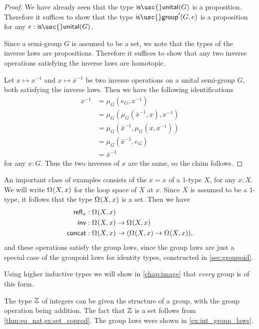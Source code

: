 \begin{proof}
  We have already seen that the type $\mathsf{is\usc{}unital}(G)$ is a proposition. Therefore it suffices to show that the type $\mathsf{is\usc{}group}'(G,e)$ is a proposition for any $e:\mathsf{is\usc{}unital}(G)$.

  Since a semi-group $G$ is assumed to be a set, we note that the types of the inverse laws are propositions. Therefore it suffices to show that any two inverse operations satisfying the inverse laws are homotopic.

  Let $x\mapsto x^{-1}$ and $x\mapsto \bar{x}^{-1}$ be two inverse operations on a unital semi-group $G$, both satisfying the inverse laws. Then we have the following identifications
  \begin{align*}
    x^{-1} & = \mu_G(e_G,x^{-1}) \\
    & = \mu_G(\mu_G(\bar{x}^{-1},x),x^{-1}) \\
    & = \mu_G(\bar{x}^{-1},\mu_G(x,x^{-1})) \\
    & = \mu_G(\bar{x}^{-1},e_G) \\
    & = \bar{x}^{-1}
  \end{align*}
  for any $x:G$. Thus the two inverses of $x$ are the same, so the claim follows.
\end{proof}

\begin{eg}
  An important class of examples consists of the  $x=x$ of a $1$-type $X$, for any $x:X$. 
  We will write $\Omega^{}(X,x)$ for the loop space of $X$ at $x$. 
  Since $X$ is assumed to be a $1$-type, it follows that the type $\Omega^{}(X,x)$ is a set. Then we have
  \begin{align*}
    \mathsf{refl}_{x} & : \Omega^{}(X,x) \\
    \mathsf{inv} & : \Omega^{}(X,x) \to \Omega^{}(X,x) \\
    \mathsf{concat} & : \Omega^{}(X,x) \to (\Omega^{}(X,x)\to \Omega^{}(X,x)),
  \end{align*}
  and these operations satisfy the group laws, since the group laws are just a special case of the groupoid laws for identity types, constructed in \cref{sec:groupoid}.
  
  Using higher inductive types we will show in \cref{chap:image} that \emph{every} group is of this form.
\end{eg}

\begin{eg}
  The type ${\mathbb{Z}}$ of integers can be given the structure of a group, with the group operation being addition. The fact that ${\mathbb{Z}}$ is a set follows from \cref{thm:eq_nat,ex:set_coprod}. The group laws were shown in \cref{ex:int_group_laws}. 
\end{eg}

